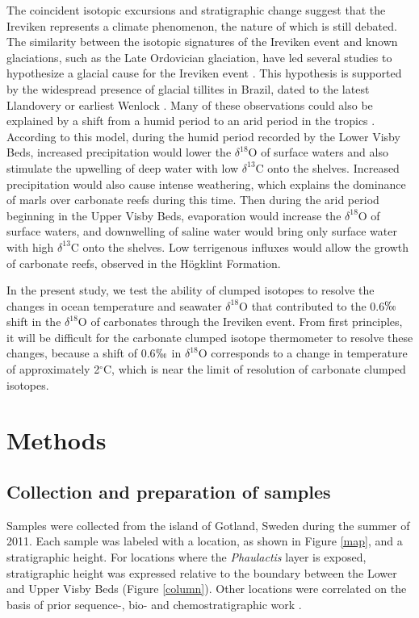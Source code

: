 \documentclass[5p, authoryear]{elsarticle}
\newcommand{\deltao}{$\delta^{18}$}
\newcommand{\deltac}{$\delta^{13}$}
\newcommand{\degrees}{$^{\circ}$}
\begin{document}
The coincident isotopic excursions and stratigraphic change suggest that the Ireviken represents a climate phenomenon, the nature of which is still debated. The similarity between the isotopic signatures of the Ireviken event and known glaciations, such as the Late Ordovician glaciation, have led several studies to hypothesize a glacial cause for the Ireviken event \citep{Azmy1998,Kaljo2003,Brand2006,Calner2008}. This hypothesis is supported by the widespread presence of glacial tillites in Brazil, dated to the latest Llandovery or earliest Wenlock \citep{Grahn1992}. Many of these observations could also be explained by a shift from a humid period to an arid period in the tropics \citep{Bickert1997,Munnecke2003,Samtleben1996}. According to this model, during the humid period recorded by the Lower Visby Beds, increased precipitation would lower the \deltao O of surface waters and also stimulate the upwelling of deep water with low \deltac C onto the shelves. Increased precipitation would also cause intense weathering, which explains the dominance of marls over carbonate reefs during this time. Then during the arid period beginning in the Upper Visby Beds, evaporation would increase the \deltao O of surface waters, and downwelling of saline water would bring only surface water with high \deltac C onto the shelves. Low terrigenous influxes would allow the growth of carbonate reefs, observed in the H\"{o}gklint Formation.

In the present study, we test the ability of clumped isotopes to resolve the changes in ocean temperature and seawater \deltao O that contributed to the 0.6$\permil$ shift in the \deltao O of carbonates through the Ireviken event. From first principles, it will be difficult for the carbonate clumped isotope thermometer to resolve these changes, because a shift of 0.6$\permil$ in \deltao O corresponds to a change in temperature of approximately 2\degrees C, which is near the limit of resolution of carbonate clumped isotopes. 

\section{Methods}

\subsection{Collection and preparation of samples}

Samples were collected from the island of Gotland, Sweden during the summer of 2011. Each sample was labeled with a location, as shown in Figure \ref{map}, and a stratigraphic height. For locations where the \textit{Phaulactis} layer is exposed, stratigraphic height was expressed relative to the boundary between the Lower and Upper Visby Beds (Figure \ref{column}). Other locations were correlated on the basis of prior sequence-, bio- and chemostratigraphic work \citep{Calner2004a}.
\end{document}
